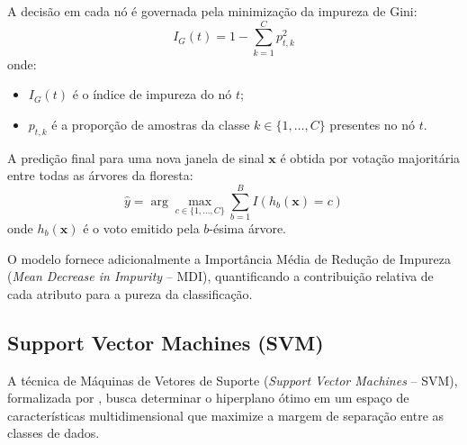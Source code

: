 A decisão em cada nó é governada pela minimização da impureza de Gini:
\begin{equation}
    I_G(t) = 1 - \sum_{k=1}^{C} p_{t, k}^2
    \label{eq:gini}
\end{equation}
onde:
\begin{itemize}
    \item $I_G(t)$ é o índice de impureza do nó $t$;
    \item $p_{t, k}$ é a proporção de amostras da classe $k \in \{1, \dots, C\}$ presentes no nó $t$.
\end{itemize}

A predição final para uma nova janela de sinal $\mathbf{x}$ é obtida por votação majoritária entre todas as árvores da floresta:
\begin{equation}
    \hat{y} = \arg\max_{c \in \{1, \dots, C\}} \sum_{b=1}^{B} I(h_b(\mathbf{x}) = c)
    \label{eq:votacao_rf}
\end{equation}
onde $h_b(\mathbf{x})$ é o voto emitido pela $b$-ésima árvore. 

O modelo fornece adicionalmente a Importância Média de Redução de Impureza (\textit{Mean Decrease in Impurity} -- MDI), quantificando a contribuição relativa de cada atributo para a pureza da classificação.

\subsection{Support Vector Machines (SVM)}
\label{subsec:svm}

A técnica de Máquinas de Vetores de Suporte (\textit{Support Vector Machines} -- SVM), formalizada por , busca determinar o hiperplano ótimo em um espaço de características multidimensional que maximize a margem de separação entre as classes de dados.

